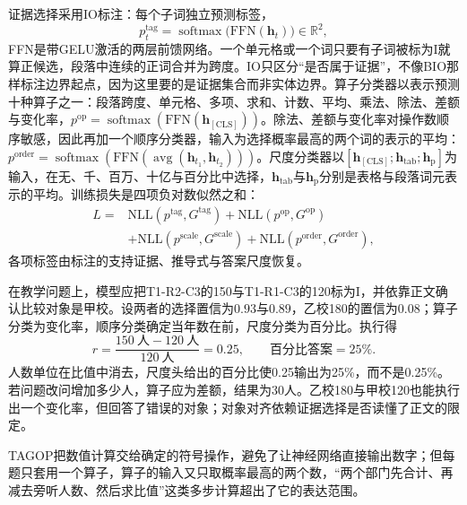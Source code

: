证据选择采用IO标注：每个子词独立预测标签，
\begin{equation}
  p^{\mathrm{tag}}_t=\operatorname{softmax}\bigl(\mathrm{FFN}(\bm h_t)\bigr)\in\mathbb R^{2},
  \label{eq:nlp-dialogue-tagop-tag}
\end{equation}
FFN是带GELU激活的两层前馈网络。一个单元格或一个词只要有子词被标为I就算正候选，段落中连续的正词合并为跨度。IO只区分“是否属于证据”，不像BIO那样标注边界起点，因为这里要的是证据集合而非实体边界。算子分类器以\code{[CLS]}表示预测十种算子之一：段落跨度、单元格、多项、求和、计数、平均、乘法、除法、差额与变化率，$p^{\mathrm{op}}=\operatorname{softmax}(\mathrm{FFN}(\bm h_{\mathrm{[CLS]}}))$。除法、差额与变化率对操作数顺序敏感，因此再加一个顺序分类器，输入为选择概率最高的两个词的表示的平均：$p^{\mathrm{order}}=\operatorname{softmax}(\mathrm{FFN}(\operatorname{avg}(\bm h_{t_1},\bm h_{t_2})))$。尺度分类器以$[\bm h_{\mathrm{[CLS]}};\bm h_{\mathrm{tab}};\bm h_{\mathrm{p}}]$为输入，在无、千、百万、十亿与百分比中选择，$\bm h_{\mathrm{tab}}$与$\bm h_{\mathrm{p}}$分别是表格与段落词元表示的平均。训练损失是四项负对数似然之和：
\begin{equation}
\begin{aligned}
  L={}&\mathrm{NLL}(p^{\mathrm{tag}},G^{\mathrm{tag}})+\mathrm{NLL}(p^{\mathrm{op}},G^{\mathrm{op}})\\
   &+\mathrm{NLL}(p^{\mathrm{scale}},G^{\mathrm{scale}})+\mathrm{NLL}(p^{\mathrm{order}},G^{\mathrm{order}}),
\end{aligned}
  \label{eq:nlp-dialogue-tagop-loss}
\end{equation}
各项标签由标注的支持证据、推导式与答案尺度恢复。

在教学问题上，模型应把T1-R2-C3的150与T1-R1-C3的120标为I，并依靠正文确认比较对象是甲校。设两者的选择置信为$0.93$与$0.89$，乙校180的置信为$0.08$；算子分类为变化率，顺序分类确定当年数在前，尺度分类为百分比。执行得
\begin{equation}
 r=\frac{150\ \text{人}-120\ \text{人}}{120\ \text{人}}
   =0.25,\qquad \text{百分比答案}=25\%.
 \label{eq:nlp-dialogue-growth}
\end{equation}
人数单位在比值中消去，尺度头给出的百分比使0.25输出为25\%，而不是0.25\%。若问题改问增加多少人，算子应为差额，结果为30人。乙校180与甲校120也能执行出一个变化率，但回答了错误的对象；对象对齐依赖证据选择是否读懂了正文的限定。

TAGOP把数值计算交给确定的符号操作，避免了让神经网络直接输出数字；但每题只套用一个算子，算子的输入又只取概率最高的两个数，“两个部门先合计、再减去旁听人数、然后求比值”这类多步计算超出了它的表达范围。

